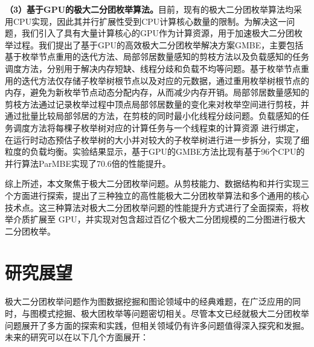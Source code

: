 \textbf{（3）基于GPU的极大二分团枚举算法。}目前，现有的极大二分团枚举算法均采用CPU实现，因此其并行扩展性受到CPU计算核心数量的限制。为解决这一问题，我们引入了具有大量计算核心的GPU作为计算资源，用于加速极大二分团枚举过程。我们提出了基于GPU的高效极大二分团枚举解决方案GMBE，主要包括基于枚举节点重用的迭代方法、局部邻居数量感知的剪枝方法以及负载感知的任务调度方法，分别用于解决内存短缺、线程分歧和负载不均等问题。基于枚举节点重用的迭代方法仅存储子枚举树根节点以及对应的元数据，通过重用枚举树根节点的内存，避免为新枚举节点动态分配内存，从而减少内存开销。局部邻居数量感知的剪枝方法通过记录枚举过程中顶点局部邻居数量的变化来对枚举空间进行剪枝，并通过批量比较局部邻居的方法，在剪枝的同时最小化线程分歧问题。负载感知的任务调度方法将每棵子枚举树对应的计算任务与一个线程束的计算资源 
进行绑定，在运行时动态预估子枚举树的大小并对较大的子枚举树进行进一步拆分，实现了细粒度的负载均衡。实验结果显示，基于GPU的GMBE方法比现有基于96个CPU的并行算法ParMBE实现了70.6倍的性能提升。

综上所述，本文聚焦于极大二分团枚举问题。从剪枝能力、数据结构和并行实现三个方面进行探索，提出了三种独立的高性能极大二分团枚举算法和多个通用的核心技术点。这三种算法对极大二分团枚举问题的性能提升方式进行了全面探索，将枚举介质扩展至 GPU，并实现对包含超过百亿个极大二分团规模的二分图进行极大二分团枚举。





\section{研究展望}

极大二分团枚举问题作为图数据挖掘和图论领域中的经典难题，在广泛应用的同时，与图模式挖掘、极大团枚举等问题密切相关。尽管本文已经就极大二分团枚举问题展开了多方面的探索和实践，但相关领域仍有许多问题值得深入探究和发掘。未来的研究可以在以下几个方面展开：


